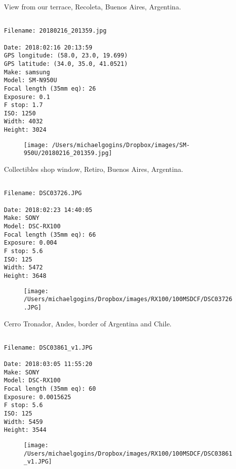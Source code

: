 \documentclass[11pt,letter,DIV=14,paper=landscape]{scrbook}
\begin{document}
\clearpage
\noindent View from our terrace, Recoleta, Buenos Aires, Argentina.
\noindent
\begin{lstlisting}

Filename: 20180216_201359.jpg

Date: 2018:02:16 20:13:59
GPS longitude: (58.0, 23.0, 19.699)
GPS latitude: (34.0, 35.0, 41.0521)
Make: samsung
Model: SM-N950U
Focal length (35mm eq): 26
Exposure: 0.1
F stop: 1.7
ISO: 1250
Width: 4032
Height: 3024
\end{lstlisting}
\clearpage

\begin{figure}
\texttt{[image: /Users/michaelgogins/Dropbox/images/SM-950U/20180216\_201359.jpg]}
\end{figure}
    
\clearpage
\noindent Collectibles shop window, Retiro, Buenos Aires, Argentina.
\noindent
\begin{lstlisting}

Filename: DSC03726.JPG

Date: 2018:02:23 14:40:05
Make: SONY
Model: DSC-RX100
Focal length (35mm eq): 66
Exposure: 0.004
F stop: 5.6
ISO: 125
Width: 5472
Height: 3648
\end{lstlisting}
\clearpage

\begin{figure}
\texttt{[image: /Users/michaelgogins/Dropbox/images/RX100/100MSDCF/DSC03726.JPG]}
\end{figure}
    
\clearpage
\noindent Cerro Tronador, Andes, border of Argentina and Chile.
\noindent
\begin{lstlisting}

Filename: DSC03861_v1.JPG

Date: 2018:03:05 11:55:20
Make: SONY
Model: DSC-RX100
Focal length (35mm eq): 60
Exposure: 0.0015625
F stop: 5.6
ISO: 125
Width: 5459
Height: 3544
\end{lstlisting}
\clearpage

\begin{figure}
\texttt{[image: /Users/michaelgogins/Dropbox/images/RX100/100MSDCF/DSC03861\_v1.JPG]}
\end{figure}
    
\end{document}
